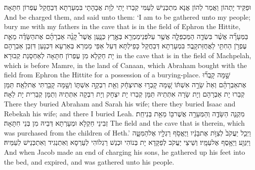 {וּפַקֵּיד יָתְהוֹן וַאֲמַר לְהוֹן אֲנָא מִתְכְּנֵישׁ לְעַמִּי קְבַרוּ יָתִי לְוָת אֲבָהָתָי בִּמְעָרְתָא דְּבַחֲקַל עֶפְרוֹן חִתָּאָה׃}
{And be charged them, and said unto them: ‘I am to be gathered unto my people; bury me with my fathers in the cave that is in the field of Ephron the Hittite,}{}
{בַּמְּעָרָ֞ה אֲשֶׁ֨ר בִּשְׂדֵ֧ה הַמַּכְפֵּלָ֛ה אֲשֶׁ֥ר עַל\maqqaf פְּנֵי\maqqaf מַמְרֵ֖א בְּאֶ֣רֶץ כְּנָ֑עַן אֲשֶׁר֩ קָנָ֨ה אַבְרָהָ֜ם אֶת\maqqaf הַשָּׂדֶ֗ה מֵאֵ֛ת עֶפְרֹ֥ן הַחִתִּ֖י לַאֲחֻזַּת\maqqaf קָֽבֶר׃}
{בִּמְעָרְתָא דְּבַחֲקַל כָּפֵילְתָּא דְּעַל אַפֵּי מַמְרֵא בְּאַרְעָא דִּכְנָעַן דִּזְבַן אַבְרָהָם יָת חַקְלָא מִן עֶפְרוֹן חִתָּאָה לְאַחְסָנַת קְבוּרָא׃}
{in the cave that is in the field of Machpelah, which is before Mamre, in the land of Canaan, which Abraham bought with the field from Ephron the Hittite for a possession of a burying-place.}{}
{שָׁ֣מָּה קָֽבְר֞וּ אֶת\maqqaf אַבְרָהָ֗ם וְאֵת֙ שָׂרָ֣ה אִשְׁתּ֔וֹ שָׁ֚מָּה קָבְר֣וּ אֶת\maqqaf יִצְחָ֔ק וְאֵ֖ת רִבְקָ֣ה אִשְׁתּ֑וֹ וְשָׁ֥מָּה קָבַ֖רְתִּי אֶת\maqqaf לֵאָֽה׃}
{תַּמָּן קְבַרוּ יָת אַבְרָהָם וְיָת שָׂרָה אִתְּתֵיהּ תַּמָּן קְבַרוּ יָת יִצְחָק וְיָת רִבְקָה אִתְּתֵיהּ וְתַמָּן קְבַרִית יָת לֵאָה׃}
{There they buried Abraham and Sarah his wife; there they buried Isaac and Rebekah his wife; and there I buried Leah.}{}
{מִקְנֵ֧ה הַשָּׂדֶ֛ה וְהַמְּעָרָ֥ה אֲשֶׁר\maqqaf בּ֖וֹ מֵאֵ֥ת בְּנֵי\maqqaf חֵֽת׃}
{זְבִינֵי חַקְלָא וּמְעָרְתָא דְּבֵיהּ מִן בְּנֵי חִתָּאָה׃}
{The field and the cave that is therein, which was purchased from the children of Heth.’}{}
{וַיְכַ֤ל יַעֲקֹב֙ לְצַוֺּ֣ת אֶת\maqqaf בָּנָ֔יו וַיֶּאֱסֹ֥ף רַגְלָ֖יו אֶל\maqqaf הַמִּטָּ֑ה וַיִּגְוַ֖ע וַיֵּאָ֥סֶף אֶל\maqqaf עַמָּֽיו׃}
{וְשֵׁיצֵי יַעֲקֹב לְפַקָּדָא יָת בְּנוֹהִי וּכְנַשׁ רַגְלוֹהִי לְעַרְסָא וְאִתְנְגִיד וְאִתְכְּנֵישׁ לְעַמֵּיהּ׃}
{And when Jacob made an end of charging his sons, he gathered up his feet into the bed, and expired, and was gathered unto his people.}{}
